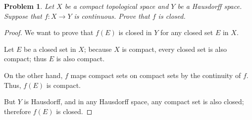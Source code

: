 \documentclass[11pt]{article}
\newtheorem{problem}{Problem}
\newtheorem{proof}{Proof}
\begin{document}
\pagebreak

\begin{problem}
Let $X$ be a compact topological space and $Y$ be a Hausdorff space. Suppose that $f: X\rightarrow Y$ is continuous. Prove that $f$ is closed.
\end{problem}
\begin{proof}
	We want to prove that $f(E)$ is closed in $Y$ for any closed set $E$ in $X$.
	
	Let $E$ be a closed set in $X$; because $X$ is compact, every closed set is also compact; thus $E$ is also compact.
	
	On the other hand, $f$ maps compact sets on compact sets by the continuity of $f$. Thus, $f(E)$ is compact.
	
	But $Y$ is Hausdorff, and in any Hausdorff space, any compact set is also closed; therefore $f(E)$ is closed.
\end{proof}
\end{document}

